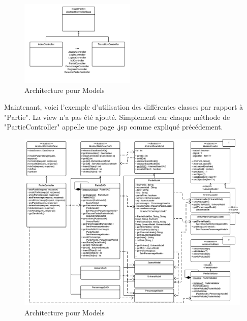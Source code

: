 \documentclass[a4paper,oneside,10pt]{article}
\begin{document}
\begin{figure}[H]
	\begin{center}
		\includegraphics[width=0.49\textwidth]{images/logiciel/arch4.png}  
		\caption{Architecture pour Models}
	\end{center}
\end{figure}

Maintenant, voici l'exemple d'utilisation des différentes classes par rapport à "Partie". 
La view n'a pas été ajouté. Simplement car chaque méthode de "PartieController" appelle une page .jsp comme expliqué précédement. 


\begin{figure}[H]
	\begin{center}
		\includegraphics[width=\textwidth]{images/logiciel/partieexemple.png}  
		\caption{Architecture pour Models}
	\end{center}
\end{figure}
\end{document}
